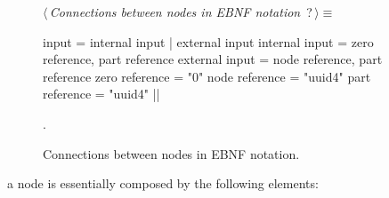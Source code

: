 \documentclass[%
    a4paper,    %
    justified,  %
    nobib,      %
    openany     %
]{tufte-book}
\makeatletter
\renewcommand{\label}[1]{\@tufte@label{##1}}%
\makeatother
\begin{document}
\begin{figure}
\begin{flushleft} \small
\begin{minipage}{\linewidth}\label{scrap62}\raggedright\small
{} $\langle\,${\itshape Connections between nodes in EBNF notation}\nobreak\ {\footnotesize {?}}$\,\rangle\equiv$
\vspace{-1ex}
\begin{pythoncode}
input = internal input | external input
internal input = zero reference, part reference
external input = node reference, part reference
zero reference = "0"
node reference = "uuid4"
part reference = "uuid4"
|\NWsep|
\end{pythoncode}
\vspace{1.5ex}
\footnotesize
\begin{list}{}{\setlength{\itemsep}{-\parsep}\setlength{\itemindent}{-\leftmargin}}
\item {\NWtxtMacroNoRef}.

\item{}
\end{list}
\end{minipage}\vspace{4ex}
\end{flushleft}
\caption{Connections between nodes in EBNF notation.}
\label{node-graph:lst:node-connections-ebnf}
\end{figure}

%

 a node is essentially
composed by the following elements:
\end{document}
